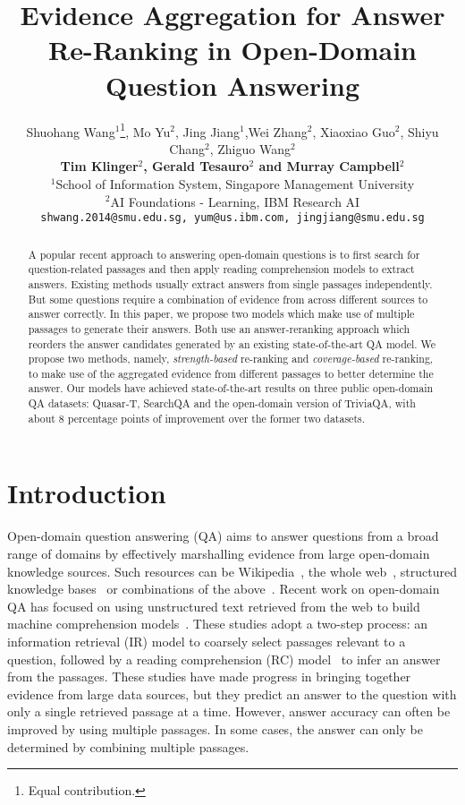 \documentclass{article} \usepackage{iclr2018_conference,times}
\title{Evidence Aggregation for Answer Re-Ranking in Open-Domain Question Answering}
\author{Shuohang Wang$^1$\thanks{Equal contribution.}, Mo Yu$^2$\samethanks,  Jing Jiang$^1$,Wei Zhang$^2$, Xiaoxiao Guo$^2$, Shiyu Chang$^2$, Zhiguo Wang$^2$\\
\textbf{Tim Klinger$^2$, Gerald Tesauro$^2$ and Murray Campbell$^2$} \\
$^1${School of Information System, Singapore Management University}\\
$^2${AI Foundations - Learning, IBM Research AI}\\
{\texttt {shwang.2014@smu.edu.sg,
 yum@us.ibm.com,
 jingjiang@smu.edu.sg}}
}
\begin{document}
\maketitle

\begin{abstract}
A popular recent approach to answering open-domain questions is to first search for question-related passages and then apply reading comprehension models to extract answers. Existing methods usually extract answers from single passages independently.  But some questions require a combination of evidence from across different sources to answer correctly. In this paper, we propose two models which make use of multiple passages to generate their answers.  Both use an answer-reranking approach which reorders the answer candidates generated by an existing state-of-the-art QA model. We propose two methods, namely, \textit{strength-based} re-ranking and \textit{coverage-based} re-ranking, to make use of the aggregated evidence from different passages to better determine the answer. Our models have achieved state-of-the-art results on three public open-domain QA datasets: Quasar-T, SearchQA and the open-domain version of TriviaQA, with about 8 percentage points of improvement over the former two datasets. 

\end{abstract}

\section{Introduction}

Open-domain question answering (QA) aims to answer questions from a broad range of domains by effectively marshalling evidence from large open-domain knowledge sources. Such resources can be Wikipedia~\citep{chen2017reading}, the whole web~\citep{ferrucci2010building}, structured knowledge bases~\citep{berant2013semantic,yu2017improved} or combinations of the above~\citep{baudivs2015modeling}. Recent work on open-domain QA has focused on using unstructured text retrieved from the web to build machine comprehension models~\citep{chen2017reading,dhingra2017quasar,wang2017r}.
These studies adopt a two-step process: an information retrieval (IR) model to coarsely select passages relevant to a question, followed by a reading comprehension (RC) model~\citep{wang2016machine,seo2016bidirectional,chen2017reading} to infer an answer from the passages. 
These studies have made progress in bringing together evidence from large data sources, but they predict an answer to the question with only a single retrieved passage at a time.
However, answer accuracy can often be improved by using multiple passages. In some cases, the answer can only be determined by combining multiple passages.
\end{document}
